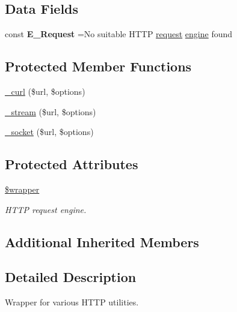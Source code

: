 \subsection*{Data Fields}
{\bf }\par
\begin{DoxyCompactItemize}
\item 
\hypertarget{class_web_a889c21a0ee6e7c0080976f8411dcba7f}{}\label{class_web_a889c21a0ee6e7c0080976f8411dcba7f} 
const {\bfseries E\+\_\+\+Request} =\textquotesingle{}No suitable H\+T\+TP \hyperlink{class_web_a65cd2273bee13f75e76463c5572e52ed}{request} \hyperlink{class_web_acf129dacf0ba4cb911f6573f8e24db54}{engine} found\textquotesingle{}
\end{DoxyCompactItemize}

\subsection*{Protected Member Functions}
\begin{DoxyCompactItemize}
\item 
\hyperlink{class_web_ace30d15b8ca06a3f846ccf20fc111beb}{\+\_\+curl} (\$url, \$options)
\item 
\hyperlink{class_web_ae9817da907b04f9d8e4fe307ef5180b8}{\+\_\+stream} (\$url, \$options)
\item 
\hyperlink{class_web_a9896cd454933a7743510844bd268b548}{\+\_\+socket} (\$url, \$options)
\end{DoxyCompactItemize}
\subsection*{Protected Attributes}
\begin{DoxyCompactItemize}
\item 
\hypertarget{class_web_ac0b1d0a2cca5e36ad2456397f4e2de6a}{}\label{class_web_ac0b1d0a2cca5e36ad2456397f4e2de6a} 
\hyperlink{class_web_ac0b1d0a2cca5e36ad2456397f4e2de6a}{\$wrapper}
\begin{DoxyCompactList}\small\item\em H\+T\+TP request engine. \end{DoxyCompactList}\end{DoxyCompactItemize}
\subsection*{Additional Inherited Members}


\subsection{Detailed Description}
Wrapper for various H\+T\+TP utilities. 

